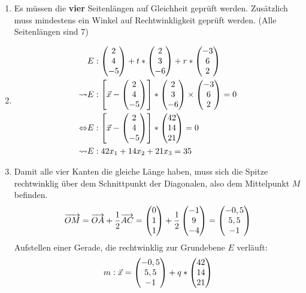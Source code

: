 \begin{lsg}{}
	\begin{enumerate}
		\item Es müssen die \textbf{vier} Seitenlängen auf Gleichheit geprüft werden. Zusätzlich muss mindestens ein Winkel auf Rechtwinkligkeit geprüft werden. (Alle Seitenlängen sind $7$)
		\item
		\begin{align*}
			&E:\begin{pmatrix} 2\\4\\-5 \end{pmatrix}+t*\begin{pmatrix} 2\\3\\-6 \end{pmatrix}+r*\begin{pmatrix} -3\\6\\2 \end{pmatrix}\\
			\rightsquigarrow&E:\left[\vec x-\begin{pmatrix} 2\\4\\-5 \end{pmatrix}\right]*\begin{pmatrix} 2\\3\\-6 \end{pmatrix}\times\begin{pmatrix} -3\\6\\2 \end{pmatrix}=0\\
			\Leftrightarrow &E:\left[\vec x-\begin{pmatrix} 2\\4\\-5 \end{pmatrix}\right]*\begin{pmatrix} 42\\14\\21 \end{pmatrix}=0\\
			\rightsquigarrow&E:42x_1+14x_2+21x_3=35
		\end{align*}
		\item Damit alle vier Kanten die gleiche Länge haben, muss sich die Spitze rechtwinklig über dem Schnittpunkt der Diagonalen, also dem Mittelpunkt $M$ befinden.
		\begin{equation*}
			\overrightarrow{OM}=\overrightarrow{OA}+\frac12\overrightarrow{AC}=\begin{pmatrix} 0\\1\\1 \end{pmatrix}+\frac12\begin{pmatrix} -1\\9\\-4 \end{pmatrix}
			=\begin{pmatrix} -0,5\\5,5\\-1 \end{pmatrix}
		\end{equation*}
		Aufstellen einer Gerade, die rechtwinklig zur Grundebene $E$ verläuft:
		\begin{equation*}
			m:\vec x=\vektor{-0,5\\5,5\\-1}+q*\vektor{42\\14\\21}

\end{equation*}
\end{enumerate}
\end{lsg}
